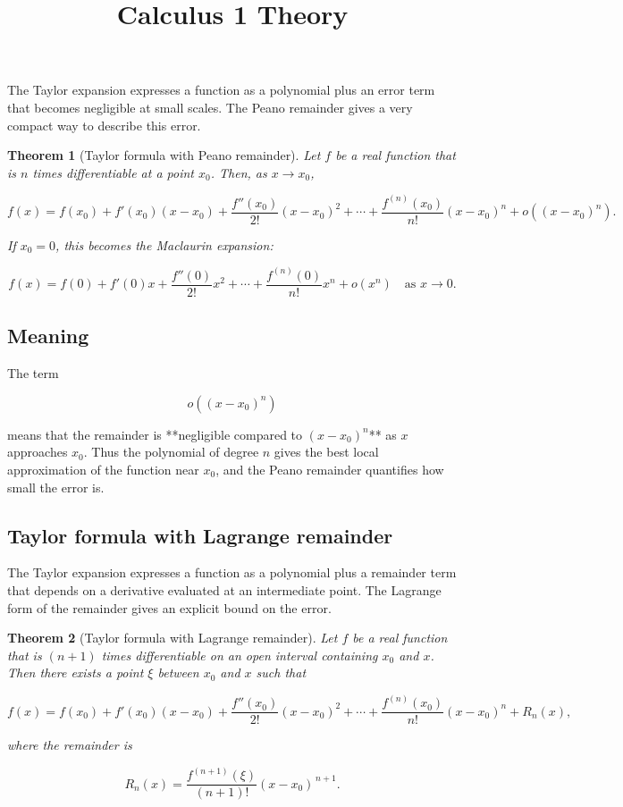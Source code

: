 \documentclass[11pt,a4paper]{article} \usepackage[T1]{fontenc}
\theoremstyle{plain} \newtheorem{theorem}{Theorem} \title{Calculus 1 Theory}
\begin{document}
The Taylor expansion expresses a function as a polynomial plus an error term
that becomes negligible at small scales. The Peano remainder gives a very
compact way to describe this error.

\begin{theorem}
[Taylor formula with Peano remainder] Let $f$ be a real function that is $n$
times differentiable at a point $x_0$. Then, as $x \to x_0$,

\[
f(x) = f(x_0)
+ f'(x_0)(x - x_0)
+ \frac{f''(x_0)}{2!}(x - x_0)^2
+ \cdots
+ \frac{f^{(n)}(x_0)}{n!}(x - x_0)^n
+ o\!\left((x - x_0)^n\right).
\]

If $x_0 = 0$, this becomes the Maclaurin expansion:

\[
f(x) = f(0)
+ f'(0)x
+ \frac{f''(0)}{2!}x^2
+ \cdots
+ \frac{f^{(n)}(0)}{n!}x^n
+ o(x^n)
\quad \text{as } x \to 0.
\]

\end{theorem}

\subsection*{Meaning}

The term

\[
o\!\left((x - x_0)^n\right)
\]

means that the remainder is **negligible compared to $(x - x_0)^n$** as $x$
approaches $x_0$. Thus the polynomial of degree $n$ gives the best local
approximation of the function near $x_0$, and the Peano remainder quantifies
how small the error is.

\subsection {Taylor formula with Lagrange remainder}

The Taylor expansion expresses a function as a polynomial plus a remainder term
that depends on a derivative evaluated at an intermediate point. The Lagrange
form of the remainder gives an explicit bound on the error.

\begin{theorem}
[Taylor formula with Lagrange remainder] Let $f$ be a real function that is
$(n+1)$ times differentiable on an open interval containing $x_0$ and $x$. Then
there exists a point $\xi$ between $x_0$ and $x$ such that

\[
f(x) = f(x_0)
+ f'(x_0)(x - x_0)
+ \frac{f''(x_0)}{2!}(x - x_0)^2
+ \cdots
+ \frac{f^{(n)}(x_0)}{n!}(x - x_0)^n
+ R_n(x),
\]

where the remainder is

\[
R_n(x) = \frac{f^{(n+1)}(\xi)}{(n+1)!}(x - x_0)^{\,n+1}.
\]

\end{theorem}
\end{document}
